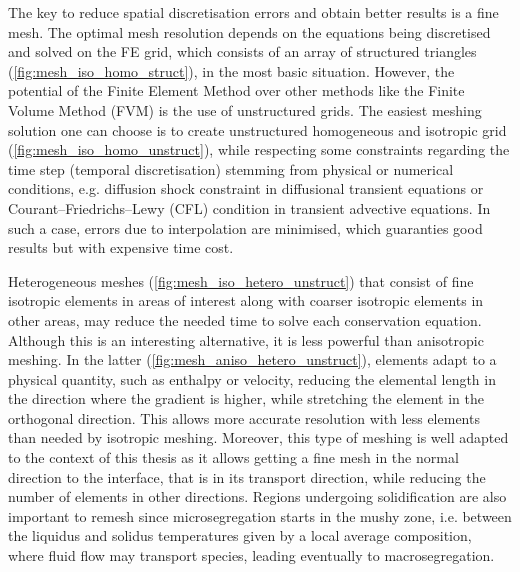 The key to reduce spatial discretisation errors and obtain better results is a fine mesh. The optimal mesh resolution
depends on the equations being discretised and solved on the FE grid, which consists of an array of structured triangles (\cref{fig:mesh_iso_homo_struct}), 
in the most basic situation. However, the potential of the Finite Element Method 
over other methods like the Finite Volume Method (FVM) 
is the use of unstructured grids. The easiest meshing solution one can 
choose is to create unstructured homogeneous and isotropic grid 
(\cref{fig:mesh_iso_homo_unstruct}), while respecting some constraints regarding the time step (temporal
discretisation) stemming from physical or numerical conditions, e.g. diffusion shock constraint in diffusional transient equations
or Courant–Friedrichs–Lewy (CFL) condition in transient advective equations. 
In such a case, errors due to interpolation are minimised,
which guaranties good results but with expensive time cost. 

Heterogeneous meshes (\cref{fig:mesh_iso_hetero_unstruct}) that consist of fine isotropic elements
in areas of interest along with coarser isotropic elements in other areas, may reduce the needed time to solve each conservation
equation. Although this is an interesting alternative, it is less powerful than anisotropic meshing. 
In the latter (\cref{fig:mesh_aniso_hetero_unstruct}),
elements adapt to a physical quantity, such as enthalpy or velocity, 
reducing the elemental length in the direction where the gradient is higher, 
while stretching the element in the orthogonal direction. This allows more accurate 
resolution with less elements than needed by isotropic meshing. Moreover, this type of 
meshing is well adapted to the context of this thesis 
as it allows getting a fine mesh in the normal direction to the interface, that is
in its transport direction, while reducing the number of elements in other directions.
Regions undergoing solidification are also important to remesh since microsegregation 
starts in the mushy zone, i.e. between the liquidus and solidus temperatures given by a local average
composition, where fluid flow may transport species, leading eventually to macrosegregation.

